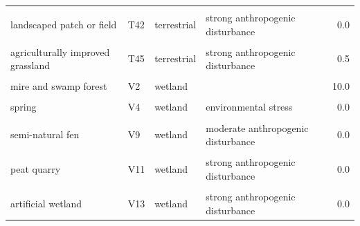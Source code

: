 \documentclass[
]{article}
\begin{document}
\begin{landscape}
\begin{longtable}[t]{llllr}
\cellcolor{gray!6}{agriculturally improved grassland with semi-natural character} & \cellcolor{gray!6}{T41} & \cellcolor{gray!6}{terrestrial} & \cellcolor{gray!6}{strong anthropogenic disturbance} & \cellcolor{gray!6}{0.5}\\
landscaped patch or field & T42 & terrestrial & strong anthropogenic disturbance & 0.0\\
\cellcolor{gray!6}{arable field} & \cellcolor{gray!6}{T44} & \cellcolor{gray!6}{terrestrial} & \cellcolor{gray!6}{strong anthropogenic disturbance} & \cellcolor{gray!6}{0.5}\\
agriculturally improved grassland & T45 & terrestrial & strong anthropogenic disturbance & 0.5\\
\addlinespace
\cellcolor{gray!6}{open fen} & \cellcolor{gray!6}{V1} & \cellcolor{gray!6}{wetland} & \cellcolor{gray!6}{} & \cellcolor{gray!6}{0.0}\\
mire and swamp forest & V2 & wetland &  & 10.0\\
\cellcolor{gray!6}{bog} & \cellcolor{gray!6}{V3} & \cellcolor{gray!6}{wetland} & \cellcolor{gray!6}{environmental stress} & \cellcolor{gray!6}{0.0}\\
spring & V4 & wetland & environmental stress & 0.0\\
\cellcolor{gray!6}{tidal and alluvial swamp forest} & \cellcolor{gray!6}{V8} & \cellcolor{gray!6}{wetland} & \cellcolor{gray!6}{environmental stress} & \cellcolor{gray!6}{10.0}\\
\addlinespace
semi-natural fen & V9 & wetland & moderate anthropogenic disturbance & 0.0\\
\cellcolor{gray!6}{semi-natural wet meadow} & \cellcolor{gray!6}{V10} & \cellcolor{gray!6}{wetland} & \cellcolor{gray!6}{moderate anthropogenic disturbance} & \cellcolor{gray!6}{0.0}\\
peat quarry & V11 & wetland & strong anthropogenic disturbance & 0.0\\
\cellcolor{gray!6}{drained mire} & \cellcolor{gray!6}{V12} & \cellcolor{gray!6}{wetland} & \cellcolor{gray!6}{strong anthropogenic disturbance} & \cellcolor{gray!6}{0.0}\\
artificial wetland & V13 & wetland & strong anthropogenic disturbance & 0.0\\*
\end{longtable}
\end{landscape}
\end{document}
